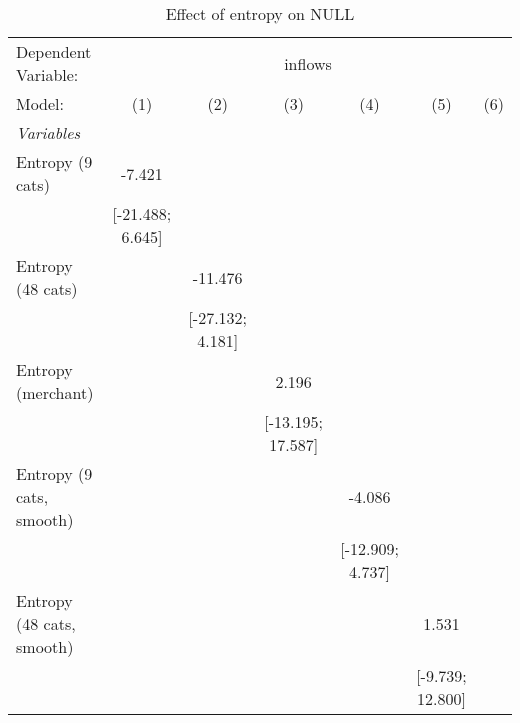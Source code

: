 
\begin{table}[htbp]
   \centering
   \tiny
   \begin{threeparttable}[b]
      \caption{\label{tab:reg_inflows_nolag} Effect of entropy on NULL}
      \begin{tabular}{lcccccc}
         \tabularnewline \midrule \midrule
         Dependent Variable: & \multicolumn{6}{c}{inflows}\\
         Model:                     & (1)                  & (2)                  & (3)                  & (4)                  & (5)                  & (6)\\  
         \midrule
         \emph{Variables}\\
         Entropy (9 cats)           & -7.421               &                      &                      &                      &                      &   \\   
                                    & [-21.488; 6.645]     &                      &                      &                      &                      &   \\   
         Entropy (48 cats)          &                      & -11.476              &                      &                      &                      &   \\   
                                    &                      & [-27.132; 4.181]     &                      &                      &                      &   \\   
         Entropy (merchant)         &                      &                      & 2.196                &                      &                      &   \\   
                                    &                      &                      & [-13.195; 17.587]    &                      &                      &   \\   
         Entropy (9 cats, smooth)   &                      &                      &                      & -4.086               &                      &   \\   
                                    &                      &                      &                      & [-12.909; 4.737]     &                      &   \\   
         Entropy (48 cats, smooth)  &                      &                      &                      &                      & 1.531                &   \\   
                                    &                      &                      &                      &                      & [-9.739; 12.800]     &   \\   

\end{tabular}
\end{threeparttable}
\end{table}
